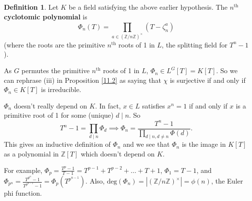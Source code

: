 \documentclass{article}
\theoremstyle{definition}
\newtheorem{defn}{Definition}[section]
\begin{document}
\begin{defn}
    Let $K$ be a field satisfying the above earlier hypothesis. The $n^{\text{th}}$ \textbf{cyclotomic polynomial} is $$\Phi_n(T)=\prod_{a \in (\mathbb{Z}/n\mathbb{Z})^\times}^{} (T-\zeta_n^a)$$ (where the roots are the primitive $n^{\text{th}}$ roots of 1 in $L$, the splitting field for $T^n-1$). 
\end{defn}
As $G$ permutes the primitive $n^{\text{th}}$ roots of 1 in $L$, $\Phi_n \in L^G[T] = K[T]$. So we can rephrase (iii) in Proposition \ref{11.2} as saying that $\chi$ is surjective if and only if $\Phi_n \in K[T]$ is irreducible.
\vspace{1mm}

$\Phi_n$ doesn't really depend on $K$. In fact, $x \in L$ satisfies $x^n=1$ if and only if $x$ is a primitive root of 1 for some (unique) $d \mid n$. So $$T^n-1 = \prod_{d \mid n}^{} \Phi_d \implies \Phi_n = \frac{T^n-1}{\prod_{d \mid n, d\neq n}^{} \Phi(d)}.$$
This gives an inductive definition of $\Phi_n$ and we see that $\Phi_n$ is the image in $K[T]$ as a polynomial in $\mathbb{Z}[T]$ which doesn't depend on $K$.

For example, $\Phi_p = \frac{T^p-1}{T-1}=T^{p-1}+T^{p-2}+\ldots+T+1$, $\Phi_1 = T-1$, and $\Phi_{p^n} = \frac{T^{p^n}-1}{T^{p^{n-1}}-1} = \Phi_p(T^{p^{n-1}})$. Also, $\text{deg}(\Phi_n) = |(\mathbb{Z}/n\mathbb{Z})^\times|=\phi(n)$, the Euler phi function.
\vspace{1mm}
\end{document}
